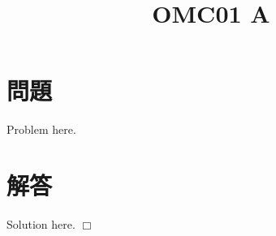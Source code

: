 \documentclass[uplatex,dvipdfmx,a4paper]{jsarticle}
\title{OMC01 A}
\date{}
\author{}
\def\qed{\hfill $\Box$}
\newenvironment{problem}{\section*{問題}}{}
\newenvironment{solution}{\section*{解答}}{\qed}
\begin{document}
\maketitle
\begin{problem}
    Problem here.
\end{problem}

\begin{solution}
    Solution here.
\end{solution}
\end{document}
